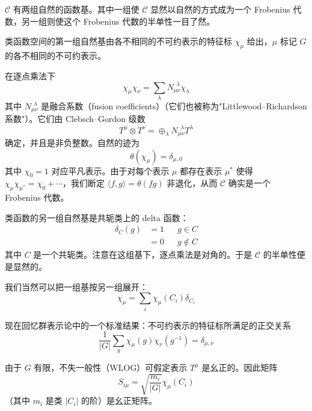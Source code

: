 $\mathcal{C}$ 有两组自然的函数基。其中一组使 $\mathcal{C}$ 显然以自然的方式成为一个 Frobenius 代数，另一组则使这个 Frobenius 代数的半单性一目了然。

类函数空间的第一组自然基由各不相同的不可约表示的特征标 $\chi_\mu$ 给出，$\mu$ 标记 $G$ 的各不相同的不可约表示。

在逐点乘法下
\begin{equation}
  \chi_\mu\chi_\nu=\sum_\lambda N_{\mu\nu}^{\ \ \lambda}\chi_\lambda
  \tag{4.205}
  \label{eq:4.205}
\end{equation}
其中 $N_{\mu\nu}^{\ \ \lambda}$ 是融合系数（fusion coefficients）（它们也被称为"Littlewood–Richardson 系数"）。它们由 Clebsch–Gordon 级数
\begin{equation}
  T^\mu\otimes T^\nu=\oplus_\lambda N_{\mu\nu}^{\ \ \lambda}T^\lambda
  \tag{4.206}
  \label{eq:4.206}
\end{equation}
确定，并且是非负整数。自然的迹为
\begin{equation}
  \theta(\chi_\mu)=\delta_{\mu,0}
  \tag{4.207}
  \label{eq:4.207}
\end{equation}
其中 $\chi_0=1$ 对应平凡表示。由于对每个表示 $\mu$ 都存在表示 $\mu^*$ 使得 $\chi_\mu\chi_{\mu^*}=\chi_0+\cdots$，我们断定 $\langle f,g\rangle=\theta(fg)$ 非退化，从而 $\mathcal{C}$ 确实是一个 Frobenius 代数。

类函数的另一组自然基是共轭类上的 delta 函数：
\begin{equation}
  \begin{aligned}
    \delta_C(g)&=1&&g\in C\\
    &=0&&g\notin C
  \end{aligned}
  \tag{4.208}
  \label{eq:4.208}
\end{equation}
其中 $C$ 是一个共轭类。注意在这组基下，逐点乘法是对角的。于是 $\mathcal{C}$ 的半单性便是显然的。

我们当然可以把一组基按另一组展开：
\begin{equation}
  \chi_\mu=\sum_i\chi_\mu(C_i)\delta_{C_i}
  \tag{4.209}
  \label{eq:4.209}
\end{equation}

现在回忆群表示论中的一个标准结果：不可约表示的特征标所满足的正交关系
\begin{equation}
  \frac{1}{|G|}\sum_g\chi_\mu(g)\chi_\nu(g^{-1})=\delta_{\mu,\nu}
  \tag{4.210}
  \label{eq:4.210}
\end{equation}

由于 $G$ 有限，不失一般性（WLOG）可假定表示 $T^\mu$ 是幺正的。因此矩阵
\begin{equation}
  S_{i\mu}=\sqrt{\frac{m_i}{|G|}}\chi_\mu(C_i)
  \tag{4.211}
  \label{eq:4.211}
\end{equation}
（其中 $m_i$ 是类 $|C_i|$ 的阶）是幺正矩阵。

